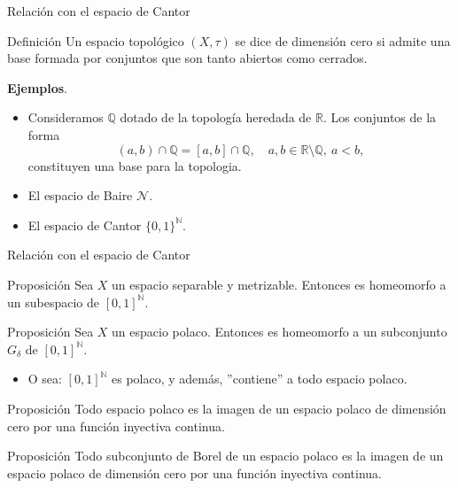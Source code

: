 \documentclass[8pt]{beamer}
\begin{document}
\begin{frame}{Relación con el espacio de Cantor}
    \begin{block}{Definición}
      Un espacio topológico $(X,\tau)$ se dice de   dimensión cero si admite una base formada por conjuntos que son tanto abiertos como cerrados.  
    \end{block}
    \pause
    \vspace{0.35cm}
    \textbf{Ejemplos}.
    \begin{itemize}
        \item  Consideramos $\mathbb{Q}$ dotado de la topología heredada de $\mathbb{R}$. Los conjuntos de la forma
    \[
    (a,b) \cap \mathbb{Q} = [a,b] \cap \mathbb{Q}, \quad a,b \in \mathbb{R} \setminus\mathbb{Q},\ a < b,
    \]
    constituyen una base para la topologia.
    \item El espacio de Baire $\mathcal{N}$.
    \item El espacio de Cantor $\{0,1\}^\mathbb{N}$.
    \end{itemize}
   
\end{frame}
\begin{frame}{Relación con el espacio de Cantor}
    \begin{block}{Proposición}
    Sea $X$ un espacio separable y metrizable. Entonces es homeomorfo a un subespacio de $[0,1]^\mathbb{N}$. 
    \end{block}
    \begin{block}{Proposición}
        Sea $X$ un espacio polaco. Entonces es homeomorfo a un subconjunto $G_\delta$ de $[0,1]^\mathbb{N}$.
    \end{block}
    \pause
    \begin{itemize}
        \item O sea: $[0,1]^\mathbb{N}$ es polaco, y además, ''contiene'' a todo espacio polaco.
    \end{itemize}
    \pause
    \begin{block}{Proposición}
        Todo espacio polaco es la imagen de un espacio polaco de dimensión cero por una función inyectiva continua.
    \end{block}
    \begin{block}{Proposición}
        Todo subconjunto de Borel de un espacio polaco es la imagen de un espacio polaco de dimensión cero por una función inyectiva continua.
    \end{block}
\end{frame}
\end{document}
